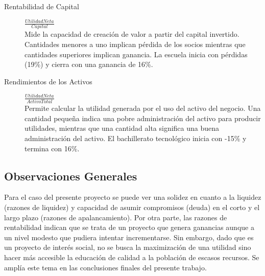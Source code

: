 \begin{description}
    \item[Rentabilidad de Capital    ] $ \frac{Utilidad Neta}{Capital}                           $ \hfill \\
    Mide la capacidad de creación de valor a partir del capital invertido. Cantidades menores a uno implican pérdida de los socios mientras que cantidades superiores implican ganancia. La escuela inicia con pérdidas (19\%) y cierra con una ganancia de 16\%.
    \item[Rendimientos de los Activos] $ \frac{Utilidad Neta}{Activo Total}                      $ \hfill \\
    Permite calcular la utilidad generada por el uso del activo del negocio. Una cantidad pequeña indica una pobre administración del activo para producir utilidades, mientras que una cantidad alta significa una buena administración del activo. El bachillerato tecnológico inicia con -15\% y termina con 16\%.
\end{description}

\subsection{Observaciones Generales}

Para el caso del presente proyecto se puede ver una solidez en cuanto a la liquidez (razones de liquidez) y capacidad de asumir compromisos (deuda) en el corto y el largo plazo (razones de apalancamiento). Por otra parte, las razones de rentabilidad indican que se trata de un proyecto que genera ganancias aunque a un nivel modesto que pudiera intentar incrementarse. Sin embargo, dado que es un proyecto de interés social, no se busca la maximización de una utilidad sino hacer más accesible la educación de calidad a la población de escasos recursos. Se amplía este tema en las conclusiones finales del presente trabajo.

